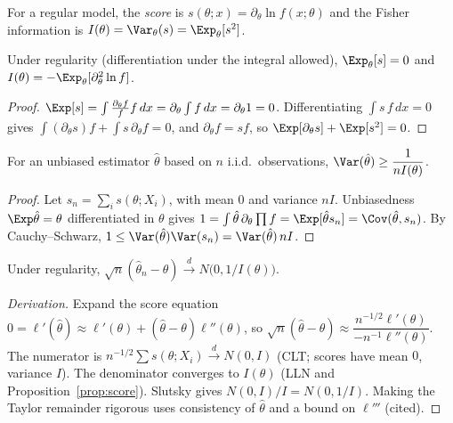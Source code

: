 \begin{definition}
For a regular model, the \emph{score} is $s(\theta;x)=\partial_\theta\ln f(x;\theta)$ and the Fisher
information is $I(\theta)=\Var_\theta(s)=\Exp_\theta[s^2]$.
\end{definition}

\begin{proposition}\label{prop:score}
Under regularity (differentiation under the integral allowed), $\Exp_\theta[s]=0$ and
$I(\theta)=-\Exp_\theta[\partial_\theta^2\ln f]$.
\end{proposition}
\begin{proof}
$\Exp[s]=\int\frac{\partial_\theta f}{f}f\,dx=\partial_\theta\int f\,dx=\partial_\theta1=0$. Differentiating
$\int s\,f\,dx=0$ gives $\int(\partial_\theta s)f+\int s\,\partial_\theta f=0$, and
$\partial_\theta f=sf$, so $\Exp[\partial_\theta s]+\Exp[s^2]=0$.
\end{proof}

\begin{theorem}\label{thm:cramerrao}
For an unbiased estimator $\hat\theta$ based on $n$ i.i.d.\ observations,
$\Var(\hat\theta)\ge\dfrac1{nI(\theta)}$.
\end{theorem}
\begin{proof}
Let $s_n=\sum_is(\theta;X_i)$, with mean $0$ and variance $nI$. Unbiasedness
$\Exp\hat\theta=\theta$ differentiated in $\theta$ gives
$1=\int\hat\theta\,\partial_\theta\prod f=\Exp[\hat\theta s_n]=\Cov(\hat\theta,s_n)$.
By Cauchy--Schwarz, $1\le\Var(\hat\theta)\Var(s_n)=\Var(\hat\theta)\,nI$.
\end{proof}

\begin{theorem}
Under regularity, $\sqrt n(\hat\theta_n-\theta)\xrightarrow{d}N\bigl(0,1/I(\theta)\bigr)$.
\end{theorem}
\begin{proof}[Derivation]
Expand the score equation $0=\ell'(\hat\theta)\approx\ell'(\theta)+(\hat\theta-\theta)\ell''(\theta)$, so
$\sqrt n(\hat\theta-\theta)\approx\dfrac{n^{-1/2}\ell'(\theta)}{-n^{-1}\ell''(\theta)}$. The numerator is
$n^{-1/2}\sum s(\theta;X_i)\xrightarrow{d}N(0,I)$ (CLT; scores have mean $0$, variance $I$). The denominator
converges to $I(\theta)$ (LLN and Proposition~\ref{prop:score}). Slutsky gives $N(0,I)/I=N(0,1/I)$. Making the
Taylor remainder rigorous uses consistency of $\hat\theta$ and a bound on $\ell'''$ (cited).
\end{proof}

